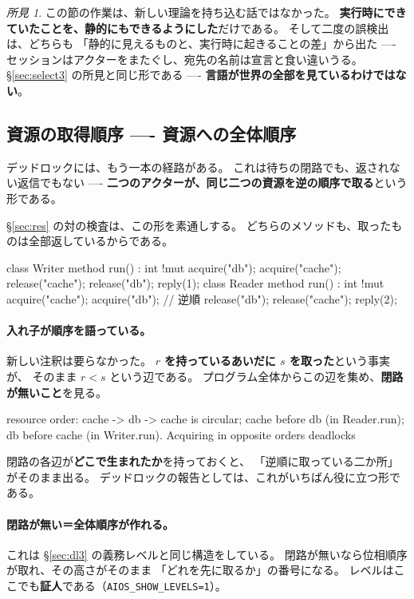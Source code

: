 \documentclass[11pt,a4paper]{ltjsarticle}
\theoremstyle{definition}
\theoremstyle{remark}
\newtheorem{finding}[theorem]{所見}
\begin{document}
\begin{finding}
この節の作業は、新しい理論を持ち込む話ではなかった。
\textbf{実行時にできていたことを、静的にもできるようにした}だけである。
そして二度の誤検出は、どちらも
「静的に見えるものと、実行時に起きることの差」から出た ----
セッションはアクターをまたぐし、宛先の名前は宣言と食い違いうる。
\S\ref{sec:select3} の所見と同じ形である ----
\textbf{言語が世界の全部を見ているわけではない}。
\end{finding}

\subsection{資源の取得順序 ---- 資源への全体順序}
\label{sec:resorder}

デッドロックには、もう一本の経路がある。
これは待ちの閉路でも、返されない返信でもない ----
\textbf{二つのアクターが、同じ二つの資源を逆の順序で取る}という形である。

\S\ref{sec:res} の対の検査は、この形を素通しする。
どちらのメソッドも、取ったものは全部返しているからである。

\begin{aipl}
class Writer {
  method run() : int !{mut} {
    acquire("db"); acquire("cache");
    release("cache"); release("db"); reply(1);
  }
}
class Reader {
  method run() : int !{mut} {
    acquire("cache"); acquire("db");     // 逆順
    release("db"); release("cache"); reply(2);
  }
}
\end{aipl}

\paragraph{入れ子が順序を語っている。}
新しい注釈は要らなかった。
\textbf{$r$ を持っているあいだに $s$ を取った}という事実が、
そのまま $r < s$ という辺である。
プログラム全体からこの辺を集め、\textbf{閉路が無いこと}を見る。

\begin{term}
 resource order: cache -> db -> cache is circular;
  cache before db (in Reader.run); db before cache (in Writer.run).
  Acquiring in opposite orders deadlocks
\end{term}

閉路の各辺が\textbf{どこで生まれたか}を持っておくと、
「逆順に取っている二か所」がそのまま出る。
デッドロックの報告としては、これがいちばん役に立つ形である。

\paragraph{閉路が無い＝全体順序が作れる。}
これは \S\ref{sec:dl3} の義務レベルと同じ構造をしている。
閉路が無いなら位相順序が取れ、その高さがそのまま
「どれを先に取るか」の番号になる。
レベルはここでも\textbf{証人}である（\texttt{AIOS\_SHOW\_LEVELS=1}）。
\end{document}
